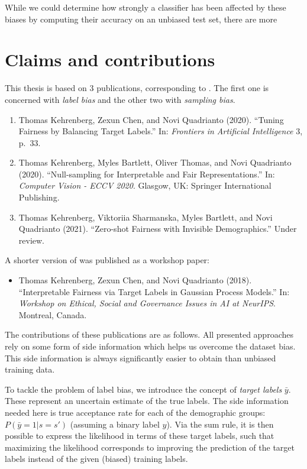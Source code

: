 While we could determine how strongly a classifier has been affected by these biases
by computing their accuracy on an unbiased test set,
there are more

\section{Claims and contributions}%
\label{sec:claims-contributions}
This thesis is based on 3 publications, corresponding to .
The first one is concerned with \emph{label bias} and the other two with \emph{sampling bias}.
\begin{enumerate}
  \item Thomas Kehrenberg, Zexun Chen, and Novi Quadrianto (2020). ``Tuning Fairness by Balancing Target Labels.''
    In: \emph{Frontiers in Artificial Intelligence} 3, p.\ 33.
    \citep{kehrenberg2020tuning}
  \item Thomas Kehrenberg, Myles Bartlett, Oliver Thomas, and Novi Quadrianto (2020).
    ``Null-sampling for Interpretable and Fair Representations.''
    In: \emph{Computer Vision - ECCV 2020}. Glasgow, UK: Springer International Publishing.
    \citep{kehrenberg2020nullsampling}
  \item Thomas Kehrenberg, Viktoriia Sharmanska, Myles Bartlett, and Novi Quadrianto (2021).
    ``Zero-shot Fairness with Invisible Demographics.''
    Under review.
    \citep{kehrenberg2020zeroshot}
\end{enumerate}
A shorter version of \citet{kehrenberg2020tuning} was published as a workshop paper:
\begin{itemize}
  \item Thomas Kehrenberg, Zexun Chen, and Novi Quadrianto (2018).
    ``Interpretable Fairness via Target Labels in Gaussian Process Models.''
    In: \emph{Workshop on Ethical, Social and Governance Issues in AI at NeurIPS}. Montreal, Canada.
\end{itemize}

The contributions of these publications are as follows.
All presented approaches rely on some form of side information which helps us overcome the dataset bias.
This side information is always significantly easier to obtain than unbiased training data.

To tackle the problem of label bias, we introduce the concept of \emph{target labels} $\bar{y}$.
These represent an uncertain estimate of the true labels.
The side information needed here is true acceptance rate for each of the demographic groups: $P(\bar{y}=1|s=s')$
(assuming a binary label $y$).
Via the sum rule, it is then possible to express the likelihood in terms of these target labels,
such that maximizing the likelihood corresponds to improving the prediction of the target labels
instead of the given (biased) training labels.

